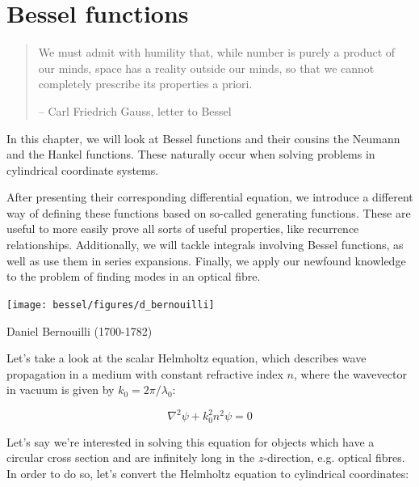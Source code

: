 \chapter{Bessel functions}
\label{h:bessel}

\begin{quote}
\noindent{}We must admit with humility that, while number is purely a product of our minds, space has a reality outside our minds, so that we cannot completely prescribe its properties a priori.

-- Carl Friedrich Gauss, letter to Bessel
\end{quote}

\chaptertoc

In this chapter, we will look at Bessel functions and their cousins the Neumann and the Hankel functions. These naturally occur when solving problems in cylindrical coordinate systems. 

After presenting their corresponding differential equation, we introduce a different way of defining these functions based on so-called generating functions. These are useful to more easily prove all sorts of useful properties, like recurrence relationships. Additionally, we will tackle integrals involving Bessel functions, as well as use them in series expansions. Finally, we apply our newfound knowledge to the problem of finding modes in an optical fibre.


\pagebreak


\label{sec-bessel-eq}

\begin{marginfigure}[.3cm]
  \texttt{[image: bessel/figures/d\_bernouilli]}
  \caption{Daniel Bernouilli (1700-1782)}
\end{marginfigure}

Let's take a look at the scalar Helmholtz equation, which describes wave propagation in a medium with constant refractive index $n$, where the wavevector in vacuum is given by $k_0=2 \pi / \lambda_0$:

\begin{equation}
\nabla^2 \psi  + k_0^2 n^2 \psi = 0 
\end{equation}

Let's say we're interested in solving this equation for objects which have a circular cross section and are infinitely long in the $z$-direction, e.g. optical fibres. In order to do so, let's convert the Helmholtz equation to cylindrical coordinates:

